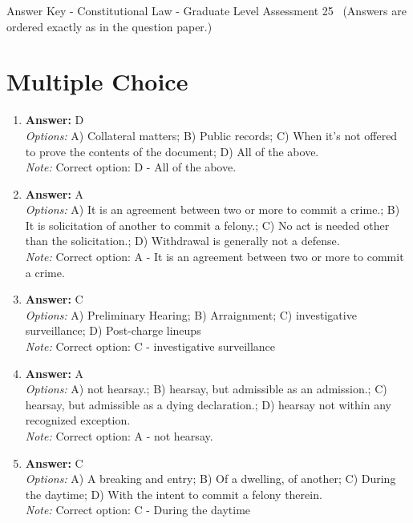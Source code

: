 \documentclass[12pt]{article}
\begin{document}
\begin{center}
Answer Key - Constitutional Law - Graduate Level Assessment 25 \
\small (Answers are ordered exactly as in the question paper.)
\end{center}

\section*{Multiple Choice}
\begin{enumerate}[label=\arabic*.]
\item \textbf{Answer:} D
\\ \textit{Options:} A) Collateral matters; B) Public records; C) When it's not offered to prove the contents of the document; D) All of the above.
\\ \textit{Note:} Correct option: D - All of the above.
\item \textbf{Answer:} A
\\ \textit{Options:} A) It is an agreement between two or more to commit a crime.; B) It is solicitation of another to commit a felony.; C) No act is needed other than the solicitation.; D) Withdrawal is generally not a defense.
\\ \textit{Note:} Correct option: A - It is an agreement between two or more to commit a crime.
\item \textbf{Answer:} C
\\ \textit{Options:} A) Preliminary Hearing; B) Arraignment; C) investigative surveillance; D) Post-charge lineups
\\ \textit{Note:} Correct option: C - investigative surveillance
\item \textbf{Answer:} A
\\ \textit{Options:} A) not hearsay.; B) hearsay, but admissible as an admission.; C) hearsay, but admissible as a dying declaration.; D) hearsay not within any recognized exception.
\\ \textit{Note:} Correct option: A - not hearsay.
\item \textbf{Answer:} C
\\ \textit{Options:} A) A breaking and entry; B) Of a dwelling, of another; C) During the daytime; D) With the intent to commit a felony therein.
\\ \textit{Note:} Correct option: C - During the daytime
\end{enumerate}
\end{document}
